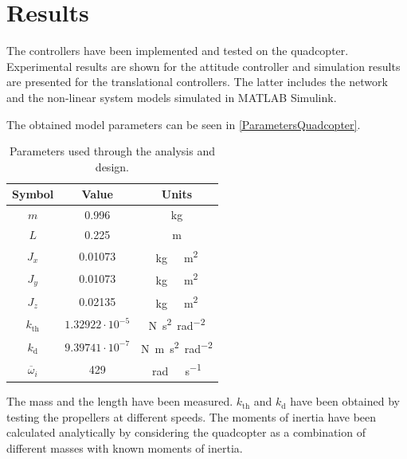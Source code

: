 \section{Results}\label{sec:results}
The controllers have been implemented and tested on the quadcopter. Experimental results are shown for the attitude controller and simulation results are presented for the translational controllers. The latter includes the network and the non-linear system models simulated in MATLAB Simulink.

The obtained model parameters can be seen in \autoref{ParametersQuadcopter}. 
\begin{table}[H]
    \centering
    \begin{tabular}{|c|c|c|}
    \hline
        \textbf{Symbol} &\textbf{Value} &\textbf{Units}\\
        \hline %
        $m$ & 0.996       &kg\\
        \hline %
        $L$  &   0.225       & m\\
        \hline %
        $J_x$  & 0.01073       & \si{kg \  m^2}\\
        \hline %
        $J_y$  & 0.01073       & \si{kg \  m^2}\\
        \hline %
        $J_z$  & 0.02135       & \si{kg \  m^2}\\
        \hline %
        $k_{\mathrm{th}}$  & $1.32922\cdot10^{-5}$       & \si{N s^2 rad^{-2}}\\
        \hline %
        $k_{\mathrm{d}}$  & $9.39741 \cdot10^{-7}$       & \si{N m s^2  rad^{-2}}\\
        \hline %
        $\overline{\omega}_i$& 429      & \si{rad \ s^{-1}}\\
        \hline
    \end{tabular}
    \caption{Parameters used through the analysis and design.}
    \label{ParametersQuadcopter}
\end{table}
The mass and the length have been measured. $k_{\mathrm{th}}$ and $k_{\mathrm{d}}$ have been obtained by testing the propellers at different speeds. The moments of inertia have been calculated analytically by considering the quadcopter as a combination of different masses with known moments of inertia.

